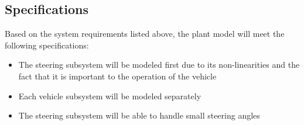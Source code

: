\documentclass[letterpaper,12pt]{article}   %
\begin{document}





%   


 \subsection{Specifications}
 Based on the system requirements listed above, the plant model will meet the following specifications:
 \begin{itemize}
    \item The steering subsystem will be modeled first due to its non-linearities and the fact that it is important to the operation of the vehicle
    \item Each vehicle subsystem will be modeled separately 
    \item The steering subsystem will be able to handle small steering angles
 \end{itemize}
\end{document}
